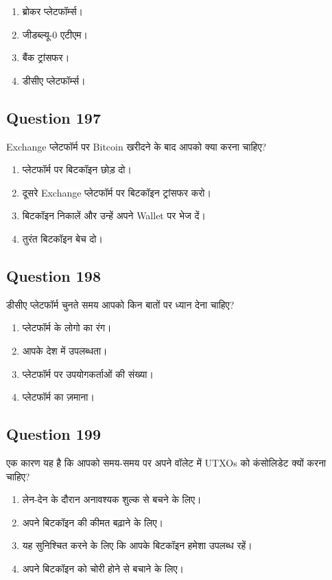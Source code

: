 \documentclass[12pt,a4paper]{article}
\begin{document}
\begin{enumerate}[label=\Alph*., leftmargin=*]
\item ब्रोकर प्लेटफॉर्म्स।
\item जीडब्ल्यू-0 एटीएम।
\item बैंक ट्रांसफर।
\item डीसीए प्लेटफॉर्म्स।
\end{enumerate}

\bigskip


\subsection*{Question 197}
Exchange प्लेटफॉर्म पर Bitcoin खरीदने के बाद आपको क्या करना चाहिए?

\begin{enumerate}[label=\Alph*., leftmargin=*]
\item प्लेटफॉर्म पर बिटकॉइन छोड़ दो।
\item दूसरे Exchange प्लेटफॉर्म पर बिटकॉइन ट्रांसफर करो।
\item बिटकॉइन निकालें और उन्हें अपने Wallet पर भेज दें।
\item तुरंत बिटकॉइन बेच दो।
\end{enumerate}

\bigskip


\subsection*{Question 198}
डीसीए प्लेटफॉर्म चुनते समय आपको किन बातों पर ध्यान देना चाहिए?

\begin{enumerate}[label=\Alph*., leftmargin=*]
\item प्लेटफॉर्म के लोगो का रंग।
\item आपके देश में उपलब्धता।
\item प्लेटफॉर्म पर उपयोगकर्ताओं की संख्या।
\item प्लेटफॉर्म का ज़माना।
\end{enumerate}

\bigskip


\subsection*{Question 199}
एक कारण यह है कि आपको समय-समय पर अपने वॉलेट में UTXOs को कंसोलिडेट क्यों करना चाहिए?

\begin{enumerate}[label=\Alph*., leftmargin=*]
\item लेन-देन के दौरान अनावश्यक शुल्क से बचने के लिए।
\item अपने बिटकॉइन की कीमत बढ़ाने के लिए।
\item यह सुनिश्चित करने के लिए कि आपके बिटकॉइन हमेशा उपलब्ध रहें।
\item अपने बिटकॉइन को चोरी होने से बचाने के लिए।
\end{enumerate}
\end{document}
